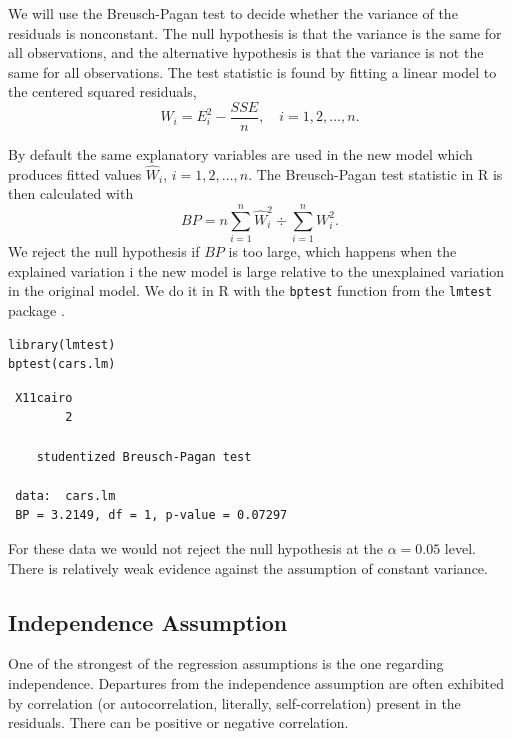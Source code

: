 \documentclass[captions=tableheading]{scrbook}
\begin{document}
We will use the Breusch-Pagan test to decide whether the variance of the residuals is nonconstant. The null hypothesis is that the variance is the same for all observations, and the alternative hypothesis is that the variance is not the same for all observations. The test statistic is found by fitting a linear model to the centered squared residuals,
\begin{equation}
W_{i} = E_{i}^{2} - \frac{SSE}{n}, \quad i=1,2,\ldots,n.
\end{equation}

By default the same explanatory variables are used in the new model which produces fitted values \(\hat{W}_{i}\), \(i=1,2,\ldots,n\). The Breusch-Pagan test statistic in \textsf{R} is then calculated with 
\begin{equation}
BP=n\sum_{i=1}^{n}\hat{W}_{i}^{2}\div\sum_{i=1}^{n}W_{i}^{2}.
\end{equation}
We reject the null hypothesis if \(BP\) is too large, which happens when the explained variation i the new model is large relative to the unexplained variation in the original model.
We do it in \textsf{R} with the \texttt{bptest} function from the \texttt{lmtest} package \cite{Zeileislmtest}. 

\begin{verbatim}
library(lmtest)
bptest(cars.lm)
\end{verbatim}

\begin{verbatim}
 X11cairo 
        2
  
 	studentized Breusch-Pagan test
 
 data:  cars.lm 
 BP = 3.2149, df = 1, p-value = 0.07297
\end{verbatim}

For these data we would not reject the null hypothesis at the \(\alpha=0.05\) level. There is relatively weak evidence against the assumption of constant variance. 
\subsection{Independence Assumption}
\label{sec-11-4-3}

\label{sub:Independence-Assumption}

One of the strongest of the regression assumptions is the one regarding independence. Departures from the independence assumption are often exhibited by correlation (or autocorrelation, literally, self-correlation) present in the residuals. There can be positive or negative correlation.
\end{document}
